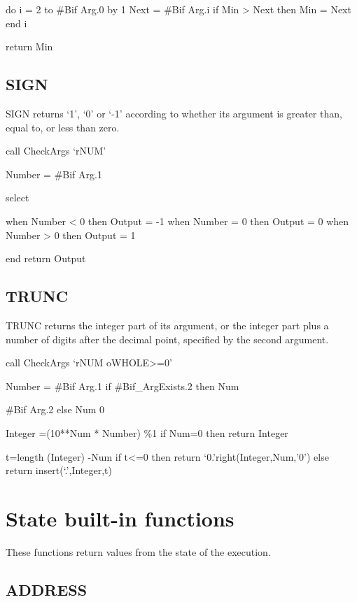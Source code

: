 do i = 2 to \#Bif Arg.0 by 1 Next = \#Bif Arg.i if Min \textgreater{}
Next then Min = Next end i

return Min

\hypertarget{sign}{%
\subsection{SIGN}\label{sign}}

SIGN returns `1', `0' or `-1' according to whether its argument is
greater than, equal to, or less than zero.

call CheckArgs `rNUM'

Number = \#Bif Arg.1

select

when Number \textless{} 0 then Output = -1 when Number = 0 then Output =
0 when Number \textgreater{} 0 then Output = 1

end return Output

\hypertarget{trunc}{%
\subsection{TRUNC}\label{trunc}}

TRUNC returns the integer part of its argument, or the integer part plus
a number of digits after the decimal point, specified by the second
argument.

call CheckArgs `rNUM oWHOLE\textgreater=0'

Number = \#Bif Arg.1 if \#Bif\_ArgExists.2 then Num

\#Bif Arg.2 else Num 0

Integer =(10**Num * Number) \%1 if Num=0 then return Integer

t=length (Integer) -Num if t\textless=0 then return
`0.'right(Integer,Num,'0') else return insert(`.',Integer,t)

\hypertarget{state-built-in-functions}{%
\section{State built-in functions}\label{state-built-in-functions}}

These functions return values from the state of the execution.

\hypertarget{address}{%
\subsection{ADDRESS}\label{address}}

